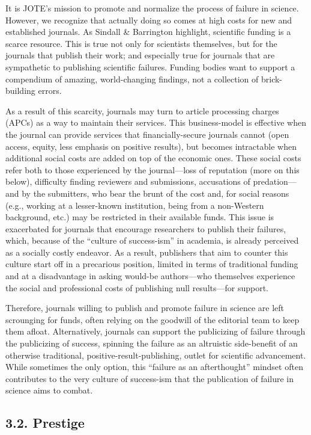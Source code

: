 \documentclass{article}
\begin{document}
It is JOTE's mission to promote and normalize the process of failure in science. However, we recognize that actually doing so comes at high costs for new and established journals. As Sindall \& Barrington highlight, scientific funding is a scarce resource. This is true not only for scientists themselves, but for the journals that publish their work; and especially true for journals that are sympathetic to publishing scientific failures. Funding bodies want to support a compendium of amazing, world-changing findings, not a collection of brick-building errors. 

As a result of this scarcity, journals may turn to article processing charges (APCs) as a way to maintain their services. This business-model is effective when the journal can provide services that financially-secure journals cannot (open access, equity, less emphasis on positive results), but becomes intractable when additional social costs are added on top of the economic ones. These social costs refer both to those experienced by the journal—loss of reputation (more on this below), difficulty finding reviewers and submissions, accusations of predation—and by the submitters, who bear the brunt of the cost and, for social reasons (e.g., working at a lesser-known institution, being from a non-Western background, etc.) may be restricted in their available funds. This issue is exacerbated for journals that encourage researchers to publish their failures, which, because of the “culture of success-ism” in academia, is already perceived as a socially costly endeavor. As a result, publishers that aim to counter this culture start off in a precarious position, limited in terms of traditional funding and at a disadvantage in asking would-be authors—who themselves experience the social and professional costs of publishing null results—for support. 

Therefore, journals willing to publish and promote failure in science are left scrounging for funds, often relying on the goodwill of the editorial team to keep them afloat. Alternatively, journals can support the publicizing of failure through the publicizing of success, spinning the failure as an altruistic side-benefit of an otherwise traditional, positive-result-publishing, outlet for scientific advancement. While sometimes the only option, this “failure as an afterthought” mindset often contributes to the very culture of success-ism that the publication of failure in science aims to combat. 



\subsection{3.2. Prestige }
\end{document}
